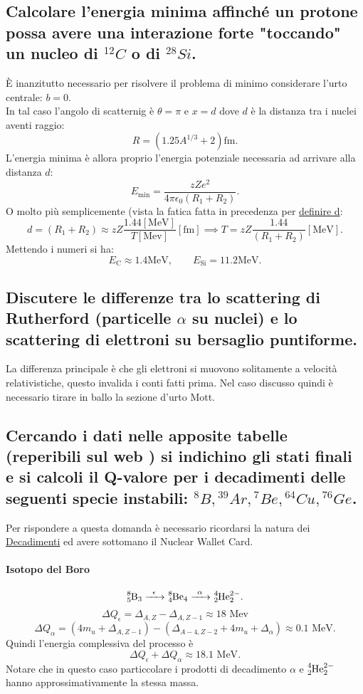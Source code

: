 \subsection[\hspace{2mm} ]{Calcolare l'energia minima affinché un protone possa avere una interazione forte "toccando" un nucleo di ${}^{12}C$ o di ${}^{28} Si$.}
È inanzitutto necessario per risolvere il problema di minimo considerare l'urto centrale: $b = 0$.\\ 
In tal caso l'angolo di scatternig è $\theta = \pi$ e $x = d$ dove $d$ è la distanza tra i nuclei aventi raggio:
\[
	R = \left( 1.25 A^{1 /3} + 2 \right) \text{fm} 
.\] 
L'energia minima è allora proprio l'energia potenziale necessaria ad arrivare alla distanza $d$:
 \[
	 E_{\text{min}} = \frac{zZe^2}{4 \pi \epsilon_0 \left( R_1 + R_2 \right) } 
.\] 
O molto più semplicemente (vista la fatica fatta in precedenza per \hyperref[eq:d-rutherford]{definire d}:
\[
	d = \left( R_1 + R_2 \right) \approx zZ\frac{1.44 [\text{MeV}]}{T[\text{Mev}] } [\text{fm}] \implies T = zZ\frac{1.44}{\left( R_1+R_2\right) } [\text{MeV}]
.\] 
Mettendo i numeri si ha:
\[
E_{\text{C}} \approx 1.4 \text{MeV} ,\quad \quad 
E_{\text{Si}} = 11.2 \text{MeV}
.\] 

\subsection[\hspace{2mm} ]{Discutere le differenze tra lo scattering di Rutherford (particelle $\alpha$ su nuclei) e lo scattering di elettroni su bersaglio puntiforme.}
La differenza principale è che gli elettroni si muovono solitamente a velocità relativistiche, questo invalida i conti fatti prima. Nel caso discusso quindi è necessario tirare in ballo la sezione d'urto Mott.

\subsection[\hspace{2mm} ]{Cercando i dati nelle apposite tabelle (reperibili sul web ) si indichino gli stati finali e si calcoli il Q-valore per i decadimenti delle seguenti specie instabili: ${}^8B, {}^{39}Ar, {}^{7}Be, {}^{64}Cu, {}^{76}Ge$. }
Per rispondere a questa domanda è necessario ricordarsi la natura dei \hyperref[sec:decadimenti]{Decadimenti} ed avere sottomano il Nuclear Wallet Card.
\paragraph{Isotopo del Boro}
\label{par:8B}
\[
	\ce{\ce{^{8}_{5}B_{3}} ->[\epsilon] \ce{^{8}_{4}\text{Be}_{4}} ->[\alpha] \ce{^{4}_{2}\text{He}^{2-}_{2}} } 
.\]
\[
	\Delta Q_{\epsilon} = \Delta_{A, Z} - \Delta_{A, Z-1} \approx 18 \text{ Mev} \quad \quad  
\]
\[
	\Delta Q_{\alpha} = ( 4m_u +  \Delta_{A,Z-1}) - \left( \Delta_{A-4, Z-2} + 4m_u + \Delta _{\alpha} \right) \approx 0.1 \text{ MeV}
.\] 
Quindi l'energia complessiva del processo è 
\[
	\Delta Q_{\epsilon}+ \Delta Q_{\alpha} \approx 18.1 \text{ MeV}.
\]
Notare che in questo caso particcolare i prodotti di decadimento $\alpha$ e $\ce{^{4}_{2}\text{He}^{2-}_{2}}$ hanno approssimativamente la stessa massa.
